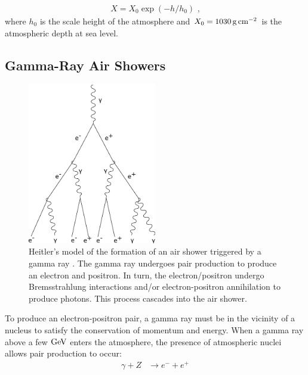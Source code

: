 \begin{equation}
    \begin{aligned}
    X=X_0\exp(-h/h_0)\text{ ,}
    \end{aligned}
\end{equation}
where $h_0$ is the scale height of the atmosphere and $X_0=1030\,\si{\gram\per\centi\meter\squared}$ is the atmospheric depth at sea level. 

\subsection{Gamma-Ray Air Showers} \label{sec:05_air_shower_gamma_ray}
\begin{figure}
    \includegraphics[width=0.5\textwidth]{05_Astronomy/Images/air_shower/gamma_ray.pdf}
    \caption{Heitler's model of the formation of an air shower triggered by a gamma ray \citep{1954qtr..book.....H}. The gamma ray undergoes pair production to produce an electron and positron. In turn, the electron/positron undergo Bremsstrahlung interactions and/or electron-positron annihilation to produce photons. This process cascades into the air shower.}
    \label{fig:chapter_2_air_shower_em}
\end{figure}
To produce an electron-positron pair, a gamma ray must be in the vicinity of a nucleus to satisfy the conservation of momentum and energy. When a gamma ray above a few $\si{\giga\electronvolt}$ enters the atmosphere, the presence of atmospheric nuclei allows pair production to occur:
\begin{equation}
    \begin{aligned}
    \gamma + Z &\rightarrow e^- + e^+
    \end{aligned}
\end{equation}
